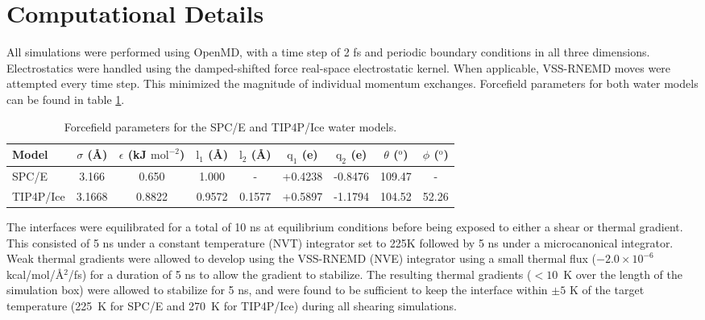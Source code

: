 \section{Computational Details}
All simulations were performed using OpenMD,\cite{OOPSE,openmd} with a
time step of 2 fs and periodic boundary conditions in all three
dimensions.  Electrostatics were handled using the damped-shifted
force real-space electrostatic kernel.\cite{Ewald} When applicable,
VSS-RNEMD moves were attempted every time step. This minimized the
magnitude of individual momentum exchanges.  Forcefield parameters for
both water models can be found in table \ref{tab:waterModels}.

\begin{table}[H]
\centering
\caption{Forcefield parameters for the SPC/E and TIP4P/Ice water
  models.}
\label{tab:waterModels}
\begin{tabular}{|l|c|c|c|c|c|c|c|c|} 
\hline
  Model &  $\sigma$ (\AA) & $\epsilon$ (kJ $\mathrm{mol}^{-2}$) &
                                                              $\mathrm{l}_{1}$
                                                              (\AA) &
                                                                    $\mathrm{l}_{2}$
                                                                      (\AA)
  & $\mathrm{q}_{1}$ (e) & $\mathrm{q}_{2}$ (e) & $\theta$
                                                  ($^{\mathrm{o}}$) &
                                                                      $\phi$ ($^{\mathrm{o}}$) \\ \hline
  SPC/E & 3.166 & 0.650 & 1.000 & - & +0.4238 & -0.8476 & 109.47 & - \\
  TIP4P/Ice & 3.1668 & 0.8822 & 0.9572 & 0.1577 & +0.5897 & -1.1794 &
  104.52 & 52.26 \\
\hline
\end{tabular}
\end {table}


The interfaces were equilibrated for a total of 10 ns at equilibrium
conditions before being exposed to either a shear or thermal gradient.
This consisted of 5 ns under a constant temperature (NVT) integrator
set to 225K followed by 5 ns under a microcanonical integrator.  Weak
thermal gradients were allowed to develop using the VSS-RNEMD (NVE)
integrator using a small thermal flux ($-2.0\times 10^{-6}$
kcal/mol/\AA$^2$/fs) for a duration of 5 ns to allow the gradient to
stabilize.  The resulting thermal gradients ($< 10$~K over the length
of the simulation box) were allowed to stabilize for 5 ns, and were
found to be sufficient to keep the interface within $\pm 5$ K of the
target temperature (225~K for SPC/E and 270~K for TIP4P/Ice) during
all shearing simulations.


